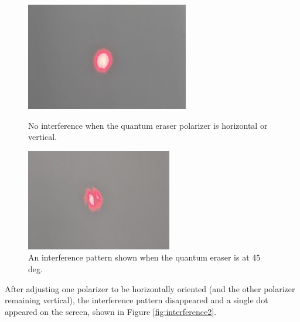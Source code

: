 \documentclass[notitlepage]{report}
\begin{document}
\begin{figure}[p]
\vspace{2em}

\begin{minipage}{0.5\linewidth}
	\centering
	\includegraphics[width=\linewidth]{interference3}
	\caption{No interference when the quantum eraser polarizer is horizontal or vertical.}
	\label{fig:interference3}
\end{minipage}
\hfill
\begin{minipage}{0.48\linewidth}
	\centering
	\includegraphics[width=\linewidth]{interference4}
	\caption{An interference pattern shown when the quantum eraser is at 45 deg.}
	\label{fig:interference4}
\end{minipage}
	\end{figure}

	
	After adjusting one polarizer to be horizontally oriented (and the other polarizer remaining vertical), the interference pattern disappeared and a single dot appeared on the screen, shown in Figure \ref{fig:interference2}.
	
\end{document}
